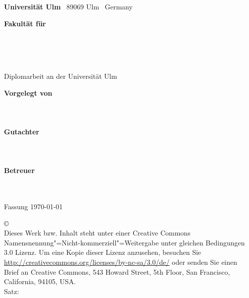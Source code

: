 \begin{fullsizetitle}
	\begin{addmargin}{3.0cm}
		{\sffamily
		\vspace{2.5cm}
		
		{\scriptsize
			\textbf{Universität Ulm} \textbar ~89069 Ulm \textbar ~Germany
			\hfill\parbox[t]{34mm}{\bfseries Fakultät für\\
			\ifaculty\\
			\mdseries \idepartment}\\[2cm]
		}
		
		\linespread{1.0}
		
		\parbox{140mm}{%
		\frigginheavy \bfseries \large \ititle}
		\\[0.5em]
		{Diplomarbeit an der Universität Ulm}\\[3em]
		
		\linespread{1.2}
		
		{
		
		\textbf{Vorgelegt von}\\
		\ifullname\\
		\iemail\\\\
		
		\textbf{Gutachter}\\
		\ireviewerA\\
		\ireviewerB\\\\
		
		\textbf{Betreuer}\\
		\iadvisor\\\\
		\iyear
		}
		}
	\end{addmargin}
\end{fullsizetitle}


\clearpage
\thispagestyle{empty}
{ \small
  \flushleft
  Fassung \today \\
  
  \vfill
  
  \copyright~\iyear~\ifullname\\[0.5em]
Dieses Werk bzw. Inhalt steht unter einer Creative Commons Namensnennung"=Nicht-kommerziell"=Weitergabe unter gleichen Bedingungen 3.0 Lizenz.
Um eine Kopie dieser Lizenz anzusehen, besuchen Sie  \url{http://creativecommons.org/licenses/by-nc-sa/3.0/de/} oder senden Sie einen Brief an Creative Commons, 543 Howard Street, 5th Floor, San Francisco, California, 94105, USA. \\
  Satz: \XeTeX
}

\clearpage